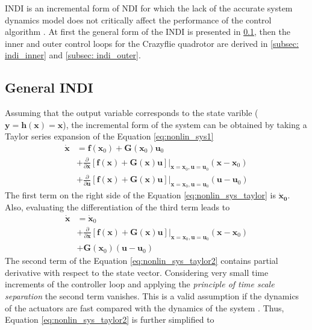 \documentclass[11pt, a4paper, twoside]{report}
\begin{document}
\acrshort{INDI} is an incremental form of \acrshort{NDI} for which the lack of the accurate system dynamics model does not critically affect the performance of the control algorithm \cite{Silva}. At first the general form of the \acrshort{INDI} is presented in \ref{subsec:indi_general}, then the inner and outer control loops for the Crazyflie quadrotor are derived in \ref{subsec: indi_inner} and \ref{subsec: indi_outer}.

\subsection{General INDI} \label{subsec:indi_general}

Assuming that the output variable corresponds to the state varible ($\bm{y}=\bm{h}(\bm{x})=\bm{x}$), the incremental form of the system can be obtained by taking a Taylor series expansion of the Equation \ref{eq:nonlin_sys1}
\begin{equation}
	\begin{split}
		\bm{\dot{x}} &= \bm{f}(\bm{x}_0) + \bm{G}(\bm{x}_0)\bm{u}_0 \\
		&+ \frac{\partial}{\partial \bm{x}} [\bm{f}(\bm{x}) + \bm{G}(\bm{x})\bm{u}] \bigg|_{\bm{x}=\bm{x}_0,\bm{u}=\bm{u}_0} (\bm{x}-\bm{x}_0) \\
		&+ \frac{\partial}{\partial \bm{u}} [\bm{f}(\bm{x}) + \bm{G}(\bm{x})\bm{u}] \bigg|_{\bm{x}=\bm{x}_0,\bm{u}=\bm{u}_0} (\bm{u}-\bm{u}_0) 
		\label{eq:nonlin_sys_taylor}
	\end{split}
\end{equation}
The first term on the right side of the Equation \ref{eq:nonlin_sys_taylor} is $\bm{\dot{x}_0}$. Also, evaluating the differentiation of the third term leads to 
\begin{equation}
	\begin{split}
		\bm{\dot{x}} &= \bm{\dot{x}}_0 \\ 
		&+ \frac{\partial}{\partial \bm{x}} [\bm{f}(\bm{x}) + \bm{G}(\bm{x})\bm{u}] \bigg|_{\bm{x}=\bm{x}_0,\bm{u}=\bm{u}_0} (\bm{x}-\bm{x}_0) \\
		&+ \bm{G}(\bm{x}_0) (\bm{u}-\bm{u}_0) 
		\label{eq:nonlin_sys_taylor2}
	\end{split}
\end{equation}
The second term of the Equation \ref{eq:nonlin_sys_taylor2} contains partial derivative with respect to the state vector. Considering very small time increments of the controller loop and applying the \textit{principle of time scale separation} the second term vanishes. This is a valid assumption if the dynamics of the actuators are fast compared with the dynamics of the system \cite{Silva}. Thus, Equation \ref{eq:nonlin_sys_taylor2} is further simplified to 
\end{document}
